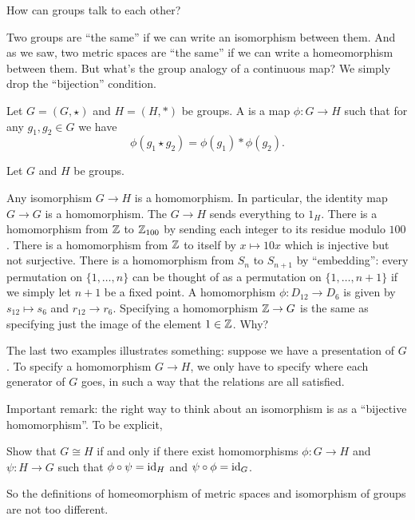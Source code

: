 How can groups talk to each other?

Two groups are ``the same'' if we can write an isomorphism between them.
And as we saw, two metric spaces are ``the same''
if we can write a homeomorphism between them.
But what's the group analogy of a continuous map?
We simply drop the ``bijection'' condition.

\begin{definition}
	Let $G = (G, \star)$ and $H = (H, \ast)$ be groups.
	A  is a map $\phi : G \to H$
	such that for any $g_1, g_2 \in G$ we have
	\[ \phi(g_1 \star g_2) = \phi(g_1) \ast \phi(g_2). \]
\end{definition}

\begin{example}
	Let $G$ and $H$ be groups.
	\begin{enumerate}[(a)]
		\ii Any isomorphism $G \to H$ is a homomorphism.
		In particular, the identity map $G \to G$ is a homomorphism.
		\ii The  $G \to H$ sends
		everything to $1_H$.
		\ii There is a homomorphism from $\mathbb Z$ to $\mathbb Z_{100}$ by
		sending each integer to its residue modulo $100$.
		\ii There is a homomorphism from $\mathbb Z$ to itself by $x \mapsto 10x$
		which is injective but not surjective.
		\ii There is a homomorphism from $S_n$ to $S_{n+1}$ by ``embedding'':
		every permutation on $\{1,\dots,n\}$ can be thought of as a permutation
		on $\{1,\dots,n+1\}$ if we simply let $n+1$ be a fixed point.
		\ii A homomorphism $\phi: D_{12} \to D_6$ is given by $s_{12} \mapsto s_6$ and $r_{12} \to r_6$.  
		\ii Specifying a homomorphism $\mathbb Z \to G$ is the same as
		specifying just the image of the element $1 \in \mathbb Z$. Why?
	\end{enumerate}
\end{example}
The last two examples illustrates something: suppose we have a presentation of $G$.
To specify a homomorphism $G \to H$, we only have to specify where each generator of $G$ goes, in such a way that the relations are all satisfied.

Important remark:
the right way to think about an isomorphism is as a ``bijective homomorphism''.
To be explicit,
\begin{exercise}
	Show that $G \cong H$ if and only if there exist
	homomorphisms $\phi : G \to H$ and $\psi : H \to G$
	such that $\phi \circ \psi = \mathrm{id}_H$ and $\psi \circ \phi = \mathrm{id}_G$.
\end{exercise}
So the definitions of homeomorphism of metric spaces
and isomorphism of groups are not too different.

